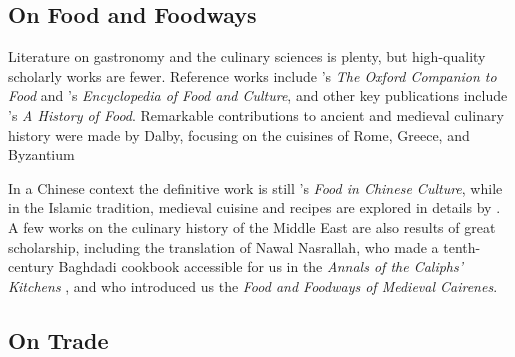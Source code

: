 










\subsection{On Food and Foodways}

Literature on gastronomy and the culinary sciences is plenty, but high-quality scholarly works are fewer. Reference works include \textcite{davidson_oxford_2014}'s \textit{The Oxford Companion to Food} and \textcite{katz_encyclopedia_2003}'s \textit{Encyclopedia of Food and Culture}, and other key publications include \textcite{toussaint-samat_history_2009}'s \textit{A History of Food}. Remarkable contributions to ancient and medieval culinary history were made by Dalby, focusing on the cuisines of Rome, Greece, and Byzantium \autocite{dalby_siren_1996,dalby_tastes_2010,dalby_classical_1996,dalby_food_2003} 

In a Chinese context the definitive work is still \textcite{chang_food_1977}'s \textit{Food in Chinese Culture}, while in the Islamic tradition, medieval cuisine and recipes are explored in details by \textcite{zaouali_medieval_2007}. A few works on the culinary history of the Middle East are also results of great scholarship, including the translation of Nawal Nasrallah, who made a tenth-century Baghdadi cookbook accessible for us in the \textit{Annals of the Caliphs' Kitchens} \autocite{ibn_sayyar_al-warraq_annals_2007}, and \textcite{lewicka_food_2011} who introduced us the \textit{Food and Foodways of Medieval Cairenes}.

\subsection{On Trade}

